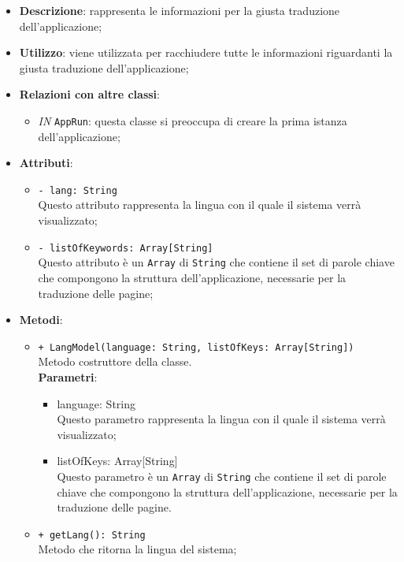 		\begin{itemize}
			\item \textbf{Descrizione}: rappresenta le informazioni per la giusta traduzione dell'applicazione;
			\item \textbf{Utilizzo}: viene utilizzata per racchiudere tutte le informazioni riguardanti la giusta traduzione dell'applicazione;
			\item \textbf{Relazioni con altre classi}: 
			\begin{itemize}
				\item \textit{IN} \texttt{AppRun}: questa classe si preoccupa di creare la prima istanza dell'applicazione;
			\end{itemize}
			\item \textbf{Attributi}: 
			\begin{itemize}
				\item \texttt{- lang: String} \\
				Questo attributo rappresenta la lingua con il quale il sistema verrà visualizzato;  
				\item \texttt{- listOfKeywords: Array[String]} \\
				Questo attributo è un \texttt{Array} di \texttt{String} che contiene il set di parole chiave che compongono la struttura dell'applicazione, necessarie per la traduzione delle pagine; 
			\end{itemize}
			\item \textbf{Metodi}: 
			\begin{itemize}
				\item \texttt{+ LangModel(language: String, listOfKeys: Array[String])} \\
				Metodo costruttore della classe.\\
				\textbf{Parametri}:
				\begin{itemize}
					\item {language: String}\\
					Questo parametro rappresenta la lingua con il quale il sistema verrà visualizzato;
					\item {listOfKeys: Array[String]}\\
					Questo parametro è un \texttt{Array} di \texttt{String} che contiene il set di parole chiave che compongono la struttura dell'applicazione, necessarie per la traduzione delle pagine. 
				\end{itemize}
				
				\item \texttt{+ getLang(): String} \\
				Metodo che ritorna la lingua del sistema;
				

\end{itemize}
\end{itemize}
